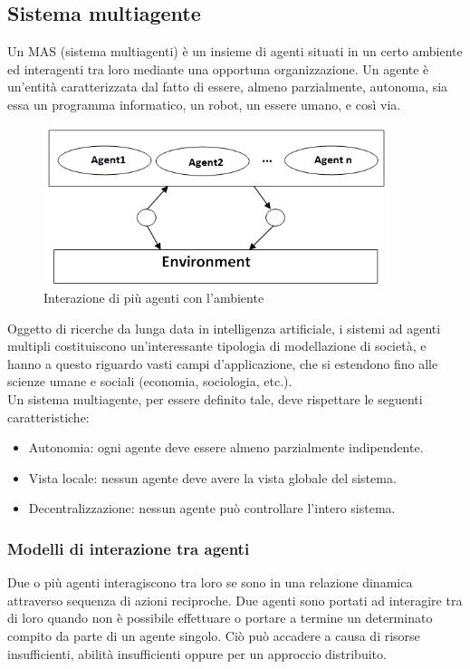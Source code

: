 \documentclass[12pt]{article}
\begin{document}
\newpage

\subsection{Sistema multiagente}
Un MAS (sistema multiagenti) è un insieme di agenti situati in un certo ambiente ed interagenti tra loro mediante una opportuna organizzazione. Un agente è un'entità caratterizzata dal fatto di essere, almeno parzialmente, autonoma, sia essa un programma informatico, un robot, un essere umano, e così via.

\begin{figure}[ht]
\centering
\includegraphics[width=0.9\textwidth,height=\textheight,keepaspectratio]{Figures/Vario/MAS.png}
\caption[Interazione di più agenti con l'ambiente]{Interazione di più agenti con l'ambiente}
\label{fig:MAS}
\end{figure}

\noindent Oggetto di ricerche da lunga data in intelligenza artificiale, i sistemi ad agenti multipli costituiscono un'interessante tipologia di modellazione di società, e hanno a questo riguardo vasti campi d'applicazione, che si estendono fino alle scienze umane e sociali (economia, sociologia, etc.). \cite{SistemaMultiagente}\\

\noindent Un sistema multiagente, per essere definito tale, deve rispettare le seguenti caratteristiche: \cite{CaratteristicheMAS}
\begin{itemize}
\item Autonomia: ogni agente deve essere almeno parzialmente indipendente.
\item Vista locale: nessun agente deve avere la vista globale del sistema.
\item Decentralizzazione: nessun agente può controllare l'intero sistema.
\end{itemize}

\newpage
\subsubsection{Modelli di interazione tra agenti}
Due o più agenti interagiscono tra loro se sono in una relazione dinamica attraverso sequenza di azioni reciproche. Due agenti sono portati ad interagire tra di loro quando non è possibile effettuare o portare a termine un determinato compito da parte di un agente singolo. Ciò può accadere a causa di risorse insufficienti, abilità insufficienti oppure per un approccio distribuito.\\
\end{document}
